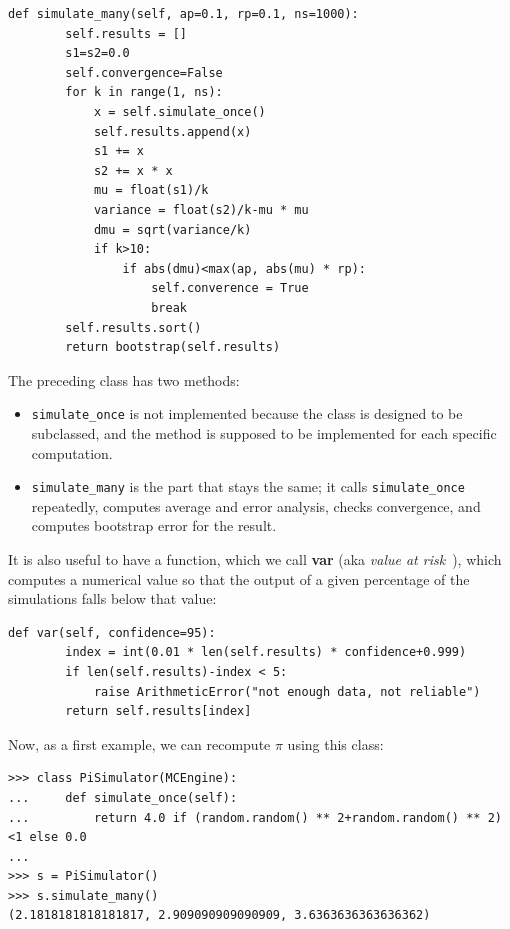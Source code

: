 \documentclass[justified, sixbynine]{tufte-book}
\def\ft{\small\tt}
\theoremstyle{plain}%
\newtheorem * {corollary}{Corollary}
\theoremstyle{definition}
\theoremstyle{remark}
\newtheorem * {remark}{Remark}
\newtheorem * {note}{Note}
\begin{document}
\begin{fullwidth}
\begin{lstlisting}[caption={in file: {\ft nlib.py}}]
    def simulate_many(self, ap=0.1, rp=0.1, ns=1000):
        self.results = []
        s1=s2=0.0
        self.convergence=False
        for k in range(1, ns):
            x = self.simulate_once()
            self.results.append(x)
            s1 += x
            s2 += x * x
            mu = float(s1)/k
            variance = float(s2)/k-mu * mu
            dmu = sqrt(variance/k)
            if k>10:
                if abs(dmu)<max(ap, abs(mu) * rp):
                    self.converence = True
                    break
        self.results.sort()
        return bootstrap(self.results)
\end{lstlisting}

The preceding class has two methods:
\begin{itemize}
\item {\ft simulate\_once} is not implemented because the class is designed to be subclassed, and the method is supposed to be implemented for each specific computation.
\item {\ft simulate\_many} is the part that stays the same; it calls {\ft simulate\_once} repeatedly, computes average and error analysis, checks convergence, and computes bootstrap error for the result.
\end{itemize}

It is also useful to have a function, which we call {\bf var} (aka {\it value at risk}~\cite{wilmott}), which computes a numerical value so that the output of a given percentage of the simulations falls below that value:

\begin{lstlisting}[caption={in file: {\ft nlib.py}}]
    def var(self, confidence=95):
        index = int(0.01 * len(self.results) * confidence+0.999)
        if len(self.results)-index < 5:
            raise ArithmeticError("not enough data, not reliable")
        return self.results[index]
\end{lstlisting}

Now, as a first example, we can recompute $\pi$ using this class:


\begin{lstlisting}
>>> class PiSimulator(MCEngine):
...     def simulate_once(self):
...         return 4.0 if (random.random() ** 2+random.random() ** 2)<1 else 0.0
...
>>> s = PiSimulator()
>>> s.simulate_many()
(2.1818181818181817, 2.909090909090909, 3.6363636363636362)
\end{lstlisting}


\end{fullwidth}
\end{document}
